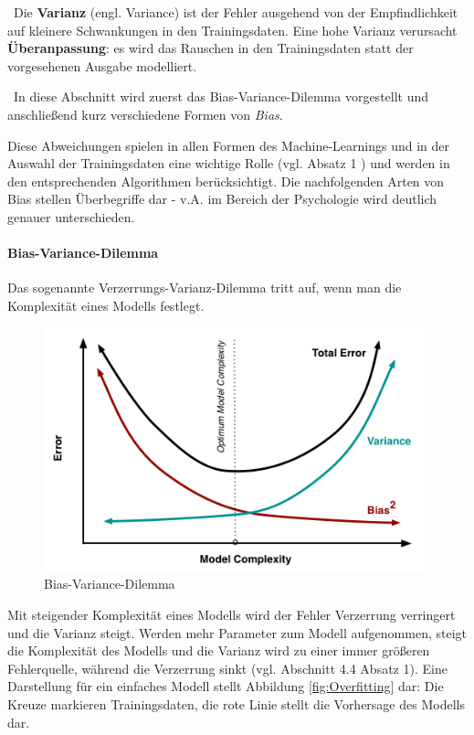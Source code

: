 ~\newline Die \textbf{Varianz} (engl. Variance) ist der Fehler ausgehend von der Empfindlichkeit auf kleinere Schwankungen in den Trainingsdaten. Eine hohe Varianz verursacht \textbf{Überanpassung}: es wird das Rauschen in den Trainingsdaten statt der vorgesehenen Ausgabe modelliert.


~\newline In diese Abschnitt wird zuerst das Bias-Variance-Dilemma vorgestellt und anschließend kurz verschiedene Formen von \textit{Bias}. 

Diese Abweichungen spielen in allen Formen des Machine-Learnings und in der Auswahl der Trainingsdaten eine wichtige Rolle (vgl. \cite{BiasTypes} Absatz 1 ) und werden in den entsprechenden Algorithmen berücksichtigt. Die nachfolgenden Arten von Bias stellen Überbegriffe dar - v.A. im Bereich der Psychologie wird deutlich genauer unterschieden.
\paragraph{Bias-Variance-Dilemma}
Das sogenannte Verzerrungs-Varianz-Dilemma tritt auf, wenn man die Komplexität eines Modells festlegt.
\begin{figure}[h]
	\begin{center}
		\includegraphics[width=0.6\linewidth]{Bilder/BiasVariance}
		\caption[Bias-Variance-Dilemma: \url{
			http://scott.fortmann-roe.com/docs/BiasVariance.html}]{Bias-Variance-Dilemma}
		\label{fig:BVDilemma}
	\end{center}
\end{figure}
Mit steigender Komplexität eines Modells wird der Fehler Verzerrung verringert und die Varianz steigt. Werden mehr Parameter zum Modell aufgenommen, steigt die Komplexität des Modells und die Varianz wird zu einer immer größeren Fehlerquelle, während die Verzerrung sinkt (vgl. \cite{BiasVarianceDilemma} Abschnitt 4.4 Absatz 1). Eine Darstellung für ein einfaches Modell stellt Abbildung \ref{fig:Overfitting} dar: Die Kreuze markieren Trainingsdaten, die rote Linie stellt die Vorhersage des Modells dar. 

